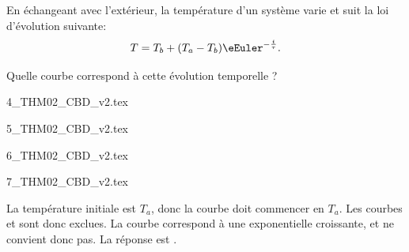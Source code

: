 \begin{enonce}
En échangeant avec l'extérieur, la température d'un système varie et suit la loi d'évolution suivante:
\[
T=T_b+ (T_a-T_b)\eEuler^{-\frac{t}{\tau}}.
\]

Quelle courbe correspond à cette évolution temporelle ?
	
	\begin{listeQCM2Colonnes}
	\item {4_THM02_CBD_v2.tex}
	\item {5_THM02_CBD_v2.tex}
	\item {6_THM02_CBD_v2.tex}
	\item {7_THM02_CBD_v2.tex}
	\end{listeQCM2Colonnes}

\bigskip
\end{enonce}

\reponse{\reponseB}

\begin{corrige}
La température initiale est $T_a$, donc la courbe doit commencer en $T_a$. Les courbes \reponseA{} et \reponseC{} sont donc exclues.
La courbe \reponseD{} correspond à une exponentielle croissante, et ne convient donc pas. La réponse est \reponseB{}.
\end{corrige}

\finEntrainement



\newpage




\hauteurLargeurCadreReponse		{12mm}{6cm}
\typeEntrainement				{} %
\initialisationEntrainement



